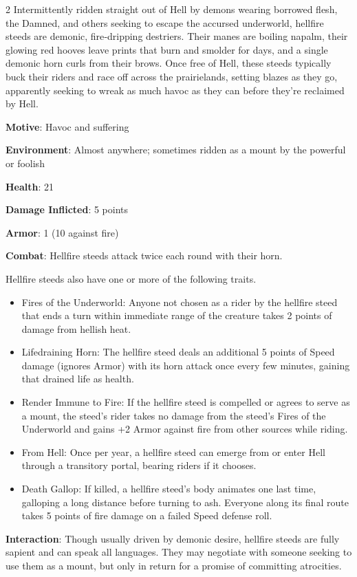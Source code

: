 \begin{multicols}{2}
Intermittently ridden straight out of Hell by demons wearing borrowed flesh, the Damned, and others seeking to escape the accursed underworld, hellfire steeds are demonic, fire‑dripping destriers. Their manes are boiling napalm, their glowing red hooves leave prints that burn and smolder for days, and a single demonic horn curls from their brows. Once free of Hell, these steeds typically buck their riders and race off across the prairielands, setting blazes as they go, apparently seeking to wreak as much havoc as they can before they’re reclaimed by Hell.

\textbf{Motive}: Havoc and suffering 

\textbf{Environment}: Almost anywhere; sometimes ridden as a mount by the powerful or foolish 

\textbf{Health}: 21 

\textbf{Damage Inflicted}: 5 points 

\textbf{Armor}: 1 (10 against fire) 

\textbf{Combat}: Hellfire steeds attack twice each round with their horn. 

Hellfire steeds also have one or more of the following traits.
\begin{itemize}
\item	Fires of the Underworld: Anyone not chosen as a rider by the hellfire steed that ends a turn within immediate range of the creature takes 2 points of damage from hellish heat. 
\item	Lifedraining Horn: The hellfire steed deals an additional 5 points of Speed damage (ignores Armor) with its horn attack once every few minutes, gaining that drained life as health. 
\item	Render Immune to Fire: If the hellfire steed is compelled or agrees to serve as a mount, the steed’s rider takes no damage from the steed’s Fires of the Underworld and gains +2 Armor against fire from other sources while riding. 
\item	From Hell: Once per year, a hellfire steed can emerge from or enter Hell through a transitory portal, bearing riders if it chooses.
\item Death Gallop: If killed, a hellfire steed’s body animates one last time, galloping a long distance before turning to ash. Everyone along its final route takes 5 points of fire damage on a failed Speed defense roll. 
\end{itemize}

\textbf{Interaction}: Though usually driven by demonic desire, hellfire steeds are fully sapient and can speak all languages. They may negotiate with someone seeking to use them as a mount, but only in return for a promise of committing atrocities. 


\end{multicols}
